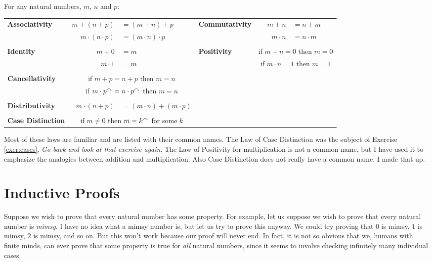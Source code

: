 \begin{laws}
\noindent For any natural numbers, $m$, $n$ and $p$:

\begin{tabular}{lr@{\,}l@{\qquad}lr@{\,}l}
\textbf{Associativity}& $m + (n + p)$      &$= (m+n)+p$           &\textbf{Commutativity}&$m + n$    &$= n + m$\\
                      &$m \cdot(n\cdot p)$ &$= (m\cdot n)\cdot p$ &                      &$m\cdot n$ &$= n\cdot m$\\
&&&&&\\ 
\textbf{Identity}&$m + 0$    &$= m$&\textbf{Positivity}&\multicolumn{2}{c}{if $m + n = 0$ then $m=0$}\\
                 &$m\cdot 1$ &$= m$&                   &\multicolumn{2}{c}{if $m\cdot n = 1$ then $m=1$}\\
&&&&&\\
\textbf{Cancellativity}&\multicolumn{2}{c}{if $m + p = n+p$ then $m=n$}&&&\\
                       &\multicolumn{2}{c}{if $m \cdot p^\curvearrowright = n\cdot p^\curvearrowright$ then $m=n$}&&&\\
&&&&&\\
\textbf{Distributivity}&$m\cdot(n+p)$&$= (m\cdot n) + (m\cdot p)$&&&\\
&&&&&\\
\textbf{Case Distinction}&\multicolumn{2}{c}{if $m\neq 0$ then $m=k^\curvearrowright$ for some $k$}&&&\\
\end{tabular}
\end{laws}
\medskip

Most of these laws are familiar and are listed with their common names. The Law of Case
Distinction was the subject of Exercise \ref{exer:cases}. \emph{Go back and look at that exercise again}.
The Law of Positivity for multiplication is not a common name, but
I have used it to emphasize the analogies between addition and multiplication.
Also Case Distinction does not really have a common name. I made that up.

\ipadbreak

\section{Inductive Proofs}

Suppose we wish to prove that every natural number has some
property. For example, let us suppose we wish to prove that every
natural number is \emph{mimsy}.  I have no idea what a mimsy number
is, but let us try to prove this anyway. We could try proving that $0$
is mimsy, $1$ is mimsy, $2$ is mimsy, and so on.  But this won't work
because our proof will never end. In fact, it is not so obvious that
we, humans with finite minds, can ever prove that some property is
true for \emph{all} natural numbers, since it seems to involve
checking infinitely many individual cases.


